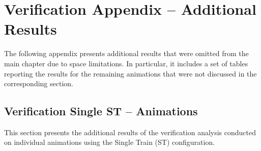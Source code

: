 \documentclass{article}
\begin{document}
\section{Verification Appendix – Additional Results}

The following appendix presents additional results that were omitted from the main chapter due to space limitations. 
In particular, it includes a set of tables reporting the results for the remaining animations that were not discussed in the corresponding section.

\subsection{Verification Single ST – Animations}
\label{subsec:vs_st_a}

This section presents the additional results of the verification analysis conducted on individual animations using the Single Train (ST) configuration.
\end{document}
